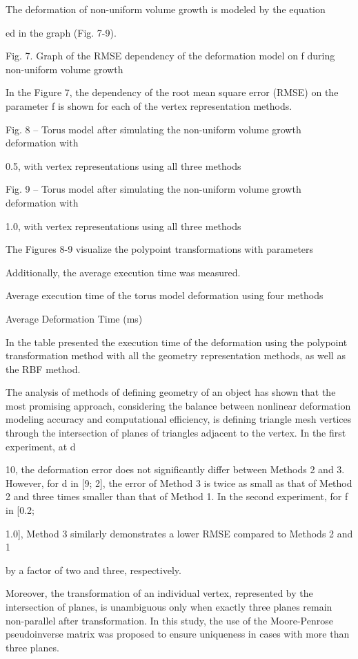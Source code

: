 \documentclass[12pt,a4paper]{article}
\begin{document}
\par
The deformation of non-uniform volume growth is modeled by the equation
\par
ed in the graph (Fig. 7-9).
\par
Fig. 7. Graph of the RMSE dependency of the deformation model on f during non-uniform volume growth
\par
In the Figure 7, the dependency of the root mean square error (RMSE) on the parameter f is shown for each of the vertex representation methods.
\par
Fig. 8 – Torus model after simulating the non-uniform volume growth deformation with
\par
0.5, with vertex representations using all three methods
\par
Fig. 9 – Torus model after simulating the non-uniform volume growth deformation with
\par
1.0, with vertex representations using all three methods
\par
The Figures 8-9 visualize the polypoint transformations with parameters
\par
Additionally, the average execution time was measured.
\par
Average execution time of the torus model deformation using four methods
\par
Average Deformation Time (ms)
\par
In the table presented the execution time of the deformation using the polypoint transformation method with all the geometry representation methods, as well as the RBF method.
\par
The analysis of methods of defining geometry of an object has shown that the most promising approach, considering the balance between nonlinear deformation modeling accuracy and computational efficiency, is defining triangle mesh vertices through the intersection of planes of triangles adjacent to the vertex. In the first experiment, at d
\par
10, the deformation error does not significantly differ between Methods 2 and 3. However, for d in [9; 2], the error of Method 3 is twice as small as that of Method 2 and three times smaller than that of Method 1. In the second experiment, for f in [0.2;
\par
1.0], Method 3 similarly demonstrates a lower RMSE compared to Methods 2 and 1
\par
by a factor of two and three, respectively.
\par
Moreover, the transformation of an individual vertex, represented by the intersection of planes, is unambiguous only when exactly three planes remain non-parallel after transformation. In this study, the use of the Moore-Penrose pseudoinverse matrix was proposed to ensure uniqueness in cases with more than three planes.
\end{document}
